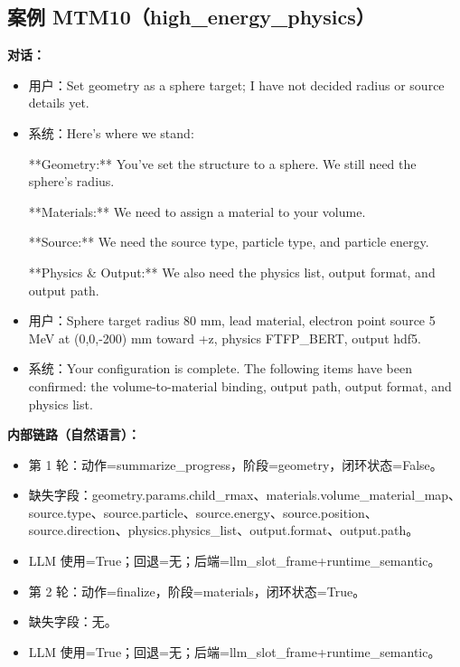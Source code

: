 \documentclass[11pt]{ctexart}
\begin{document}
\subsection{案例 MTM10（high\_energy\_physics）}
\textbf{对话：}
\begin{itemize}
\item 用户：Set geometry as a sphere target; I have not decided radius or source details yet.
\item 系统：Here's where we stand:

**Geometry:** You've set the structure to a sphere. We still need the sphere's radius.

**Materials:** We need to assign a material to your volume.

**Source:** We need the source type, particle type, and particle energy.

**Physics \& Output:** We also need the physics list, output format, and output path.
\item 用户：Sphere target radius 80 mm, lead material, electron point source 5 MeV at (0,0,-200) mm toward +z, physics FTFP\_BERT, output hdf5.
\item 系统：Your configuration is complete. The following items have been confirmed: the volume-to-material binding, output path, output format, and physics list.
\end{itemize}
\textbf{内部链路（自然语言）：}
\begin{itemize}
\item 第 1 轮：动作=summarize\_progress，阶段=geometry，闭环状态=False。
\item 缺失字段：geometry.params.child\_rmax、materials.volume\_material\_map、source.type、source.particle、source.energy、source.position、source.direction、physics.physics\_list、output.format、output.path。
\item LLM 使用=True；回退=无；后端=llm\_slot\_frame+runtime\_semantic。
\item 第 2 轮：动作=finalize，阶段=materials，闭环状态=True。
\item 缺失字段：无。
\item LLM 使用=True；回退=无；后端=llm\_slot\_frame+runtime\_semantic。
\end{itemize}
\end{document}
